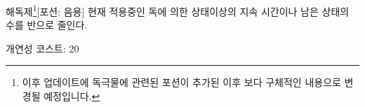 \documentclass{report}
\begin{document}
	\begin{story}{해독제\footnote{이후 업데이트에 독극물에 관련된 포션이 추가된 이후 보다 구체적인 내용으로 변경될 예정입니다.}}{[포션: 음용]}
		현재 적용중인 독에 의한 상태이상의 지속 시간이나 남은 상태의 수를 반으로 줄인다.
		
		개연성 코스트: 20
	\end{story}
\end{document}

